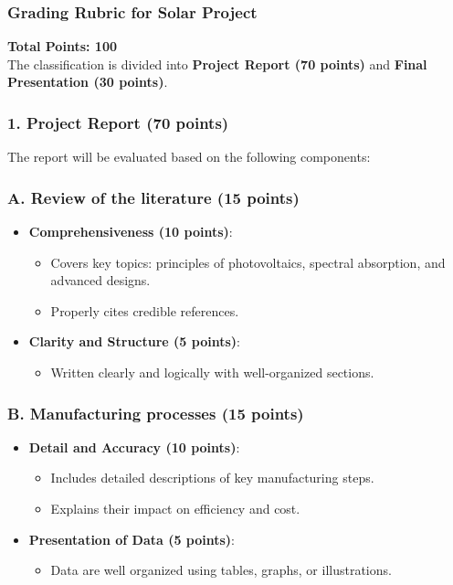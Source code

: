 \documentclass[11pt]{article}
\begin{document}
\subsubsection*{Grading Rubric for Solar Project}

\textbf{Total Points: 100}\\
The classification is divided into \textbf{Project Report (70 points)} and \textbf{Final Presentation (30 points)}.

\subsubsection*{1. Project Report (70 points)}
The report will be evaluated based on the following components:

\subsubsection*{A. Review of the literature (15 points)}
\begin{itemize}
    \item \textbf{Comprehensiveness (10 points)}:
    \begin{itemize}
        \item Covers key topics: principles of photovoltaics, spectral absorption, and advanced designs.
        \item Properly cites credible references.
    \end{itemize}
    \item \textbf{Clarity and Structure (5 points)}:
    \begin{itemize}
        \item Written clearly and logically with well-organized sections.
    \end{itemize}
\end{itemize}

\subsubsection*{B. Manufacturing processes (15 points)}
\begin{itemize}
    \item \textbf{Detail and Accuracy (10 points)}:
    \begin{itemize}
        \item Includes detailed descriptions of key manufacturing steps.
        \item Explains their impact on efficiency and cost.
    \end{itemize}
    \item \textbf{Presentation of Data (5 points)}:
    \begin{itemize}
        \item Data are well organized using tables, graphs, or illustrations.
    \end{itemize}
\end{itemize}
\end{document}
